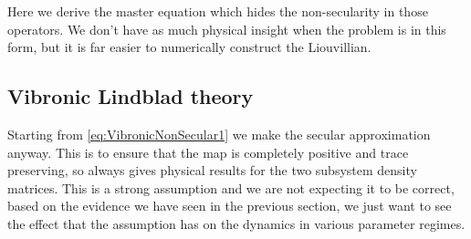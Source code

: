 \documentclass[]{article}
\begin{document}
Here we derive the master equation which hides the non-secularity in those operators. We don't have as much physical insight when the problem is in this form, but it is far easier to numerically construct the Liouvillian.

\subsection{Vibronic Lindblad theory}
\label{ssec:sec}
Starting from \ref{eq:VibronicNonSecular1} we make the secular approximation anyway. This is to ensure that the map is completely positive and trace preserving, so always gives physical results for the two subsystem density matrices. This is a strong assumption and we are not expecting it to be correct, based on the evidence we have seen in the previous section, we just want to see the effect that the assumption has on the dynamics in various parameter regimes.
\end{document}
